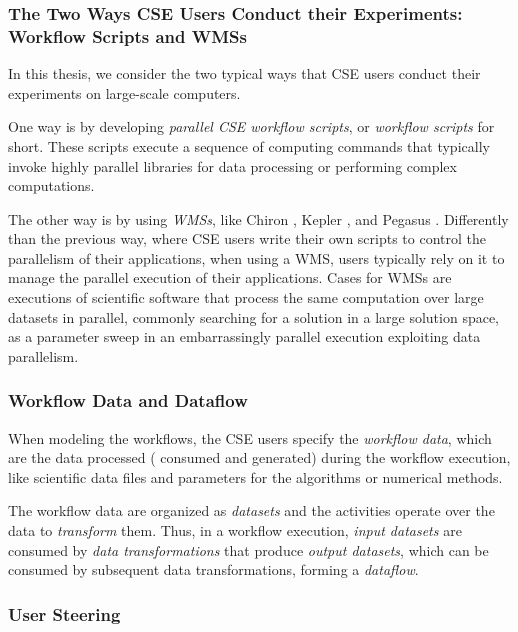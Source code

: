 \subsubsection{The Two Ways CSE Users Conduct their Experiments: Workflow Scripts and WMSs}

In this thesis, we consider the two typical ways that CSE users conduct their experiments on large-scale computers.

One way is by developing \textit{parallel CSE workflow scripts}, or \textit{workflow scripts} for short. These scripts execute a sequence of computing commands that typically invoke highly parallel libraries for data processing or performing complex computations.

The other way is by using \textit{WMSs}, like Chiron \cite{Ogasawara2011algebraic}, Kepler \cite{Nguyen2015WorkWays:}, and Pegasus \cite{Deelman2015Pegasus}.
Differently than the previous way, where CSE users write their own scripts to control the parallelism of their applications, when using a WMS, users typically rely on it to manage the parallel execution of their applications. Cases for WMSs are executions of scientific software that process the same computation over large datasets in parallel, commonly searching for a solution in a large solution space, as a parameter sweep in an embarrassingly parallel execution exploiting data parallelism.

\subsubsection{Workflow Data and Dataflow}

When modeling the workflows, the CSE users specify the \textit{workflow data}, which are the data processed (\ie{} consumed and generated) during the workflow execution, like scientific data files and parameters for the algorithms or numerical methods.

The workflow data are organized as \textit{datasets} and the activities operate over the data to \textit{transform} them. Thus, in a workflow execution, \textit{input datasets} are consumed by \textit{data transformations} that produce \textit{output datasets}, which can be consumed by subsequent data transformations, forming a \textit{dataflow}.


\subsubsection{User Steering}


